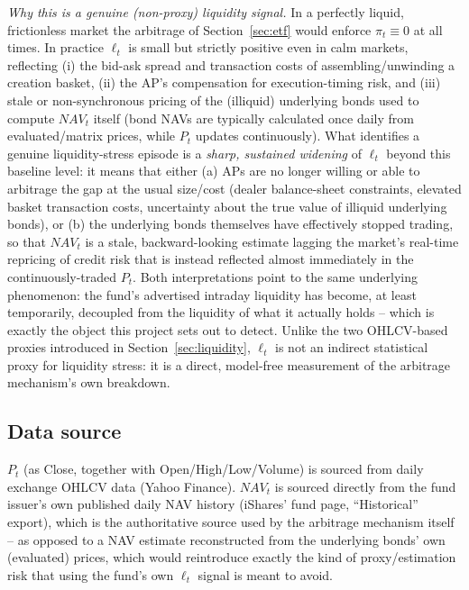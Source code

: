 \documentclass[11pt]{article}
\theoremstyle{definition}
\theoremstyle{remark}
\begin{document}
\emph{Why this is a genuine (non-proxy) liquidity signal.} In a perfectly liquid, frictionless market the arbitrage of Section~\ref{sec:etf} would enforce $\pi_t\equiv0$ at all times. In practice $\ell_t$ is small but strictly positive even in calm markets, reflecting (i) the bid-ask spread and transaction costs of assembling/unwinding a creation basket, (ii) the AP's compensation for execution-timing risk, and (iii) stale or non-synchronous pricing of the (illiquid) underlying bonds used to compute $NAV_t$ itself (bond NAVs are typically calculated once daily from evaluated/matrix prices, while $P_t$ updates continuously). What identifies a genuine liquidity-stress episode is a \emph{sharp, sustained widening} of $\ell_t$ beyond this baseline level: it means that either (a) APs are no longer willing or able to arbitrage the gap at the usual size/cost (dealer balance-sheet constraints, elevated basket transaction costs, uncertainty about the true value of illiquid underlying bonds), or (b) the underlying bonds themselves have effectively stopped trading, so that $NAV_t$ is a stale, backward-looking estimate lagging the market's real-time repricing of credit risk that is instead reflected almost immediately in the continuously-traded $P_t$. Both interpretations point to the same underlying phenomenon: the fund's advertised intraday liquidity has become, at least temporarily, decoupled from the liquidity of what it actually holds -- which is exactly the object this project sets out to detect. Unlike the two OHLCV-based proxies introduced in Section~\ref{sec:liquidity}, $\ell_t$ is not an indirect statistical proxy for liquidity stress: it is a direct, model-free measurement of the arbitrage mechanism's own breakdown.

\subsection{Data source}

$P_t$ (as Close, together with Open/High/Low/Volume) is sourced from daily exchange OHLCV data (Yahoo Finance). $NAV_t$ is sourced directly from the fund issuer's own published daily NAV history (iShares' fund page, ``Historical'' export), which is the authoritative source used by the arbitrage mechanism itself -- as opposed to a NAV estimate reconstructed from the underlying bonds' own (evaluated) prices, which would reintroduce exactly the kind of proxy/estimation risk that using the fund's own $\ell_t$ signal is meant to avoid.

\end{document}
